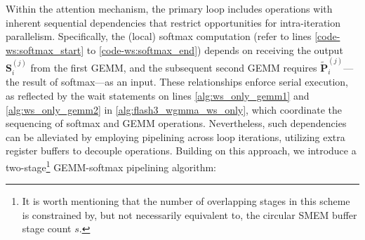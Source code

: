Within the attention mechanism, the primary loop includes operations with inherent sequential dependencies that restrict opportunities for intra-iteration parallelism. Specifically, the (local) softmax computation (refer to lines \ref{code-ws:softmax_start} to \ref{code-ws:softmax_end}) depends on receiving the output $\mathbf{S}_i^{(j)}$ from the first GEMM, and the subsequent second GEMM requires $\widetilde{\mathbf{P}}_i^{(j)}$—the result of softmax—as an input. These relationships enforce serial execution, as reflected by the wait statements on lines \ref{alg:ws_only_gemm1} and \ref{alg:ws_only_gemm2} in \cref{alg:flash3_wgmma_ws_only}, which coordinate the sequencing of softmax and GEMM operations. Nevertheless, such dependencies can be alleviated by employing pipelining across loop iterations, utilizing extra register buffers to decouple operations. Building on this approach, we introduce a two-stage\footnote{It is worth mentioning that the number of overlapping stages in this scheme is constrained by, but not necessarily equivalent to, the circular SMEM buffer stage count $s$.} GEMM-softmax pipelining algorithm:

